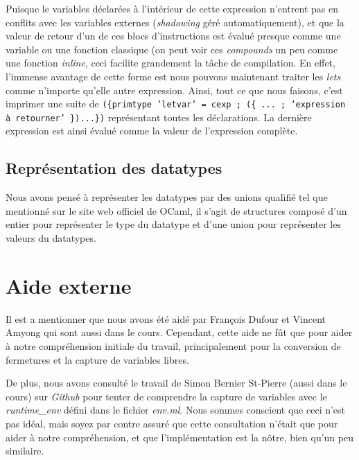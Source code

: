 \documentclass{article}
\begin{document}
Puisque le variables déclarées à l'intérieur de cette expression n'entrent
pas en conflits avec les variables externes (\emph{shadowing} géré
automatiquement), et que la valeur de retour d'un de ces blocs d'instructions
est évalué presque comme une variable ou une fonction
classique (on peut voir ces \emph{compounds} un peu comme une fonction 
\emph{inline}, ceci facilite grandement la tâche de compilation. En effet,
l'immense avantage de cette forme est nous pouvons maintenant traiter les
\emph{lets} comme n'importe qu'elle autre expression. Ainsi, tout ce que
nous faisons, c'est imprimer une suite de
\texttt{(\{primtype 'letvar' = cexp ; (\{ ... ;
  'expression à retourner' \})...\})}
représentant toutes les déclarations. La dernière expression est ainsi évalué
comme la valeur de l'expression complète.


\subsection{Représentation des datatypes}
Nous avons pensé à représenter les datatypes par des unions qualifié tel que
mentionné sur le site web officiel de OCaml, il s'agit de structures composé
d'un entier pour représenter le type du datatype et d'une union pour
représenter les valeurs du datatypes.

\section{Aide externe}
Il est a mentionner que nous avons été aidé par François Dufour et Vincent
Amyong qui sont aussi dans le cours. Cependant, cette aide ne fût que pour aider
à notre compréhension initiale du travail, principalement pour la conversion de
fermetures et la capture de variables libres.

De plus, nous avons consulté le travail de Simon Bernier St-Pierre (aussi dans
le cours) sur \emph{Github} \cite{sbstp} pour tenter de comprendre la capture de
variables avec le \emph{runtime\_env} défini dans le fichier \emph{env.ml}.
Nous sommes conscient que ceci n'est pas idéal, mais soyez par contre assuré
que cette consultation n'était que pour aider à notre compréhension, et que
l'implémentation est la nôtre, bien qu'un peu similaire.
 
\end{document}
